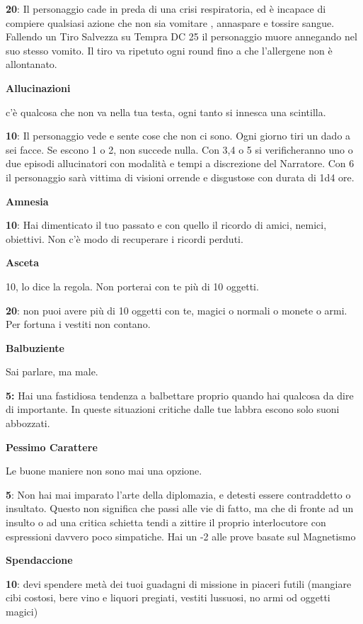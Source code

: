 \documentclass[a4paper,11pt,twoside,openany]{book}
\begin{document}
{\textbf{20}: Il personaggio cade in preda di una crisi respiratoria, ed è incapace di compiere qualsiasi azione che non sia vomitare , annaspare e tossire sangue. Fallendo un Tiro Salvezza su Tempra DC 25 il personaggio muore annegando nel suo stesso vomito. Il tiro va ripetuto ogni round fino a che l'allergene non è allontanato.

\textbf{Allucinazioni}

c'è qualcosa che non va nella tua testa, ogni tanto si innesca una scintilla.

\textbf{10}: Il personaggio vede e sente cose che non ci sono. Ogni giorno tiri un dado a sei facce.
Se escono 1 o 2, non succede nulla.
Con 3,4 o 5 si verificheranno uno o due episodi allucinatori con modalità e tempi a discrezione del Narratore.
Con 6 il personaggio sarà vittima di visioni orrende e disgustose con durata di 1d4 ore. 

\textbf{Amnesia}

\textbf{10}: Hai dimenticato il tuo passato e con quello il ricordo di amici, nemici, obiettivi. Non c'è modo di recuperare i ricordi perduti.

\textbf{Asceta}

10, lo dice la regola. Non porterai con te più di 10 oggetti.

\textbf{20}: non puoi avere più di 10 oggetti con te, magici o normali o monete o armi. Per fortuna i vestiti non contano.

\textbf{Balbuziente}

Sai parlare, ma male.

\textbf{5:} Hai una fastidiosa tendenza a balbettare proprio quando hai qualcosa da dire di importante. In queste situazioni critiche dalle tue labbra escono solo suoni abbozzati.

\textbf{Pessimo Carattere}

Le buone maniere non sono mai una opzione.

\textbf{5}: Non hai mai imparato l'arte della diplomazia, e detesti essere contraddetto o insultato. Questo non significa che passi alle vie di fatto, ma che di fronte ad un insulto o ad una critica schietta tendi a zittire il proprio interlocutore con espressioni davvero poco simpatiche. Hai un -2 alle prove basate sul Magnetismo

\textbf{Spendaccione}

\textbf{10}: devi spendere metà dei tuoi guadagni di missione in piaceri futili (mangiare cibi costosi, bere vino e liquori pregiati, vestiti lussuosi, no armi od oggetti magici)

}
\end{document}
